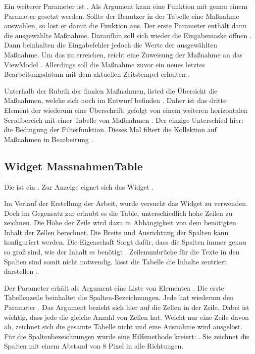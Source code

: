Ein weiterer Parameter ist  .
Als Argument kann eine Funktion mit genau einem Parameter gesetzt werden.
Sollte der Benutzer in der Tabelle eine Maßnahme auswählen, so löst er damit die Funktion aus.
Der erste Parameter enthält dann die ausgewählte Maßnahme.
Daraufhin soll sich wieder die Eingabemaske öffnen .
Dann beinhalten die Eingabefehler jedoch die Werte der ausgewählten Maßnahme.  Um das zu erreichen, reicht eine Zuweisung der Maßnahme an das ViewModel . Allerdings soll die Maßnahme zuvor ein neues letztes Bearbeitungsdatum mit dem aktuellen Zeitstempel erhalten .

Unterhalb der Rubrik der finalen Maßnahmen, listed die Übersicht die Maßnahmen, welche sich noch im Entwurf befinden .
Daher ist das dritte Element der  wiederum eine Überschrift:   gefolgt von einem weiteren horizontalen Scrollbereich  mit einer Tabelle von Maßnahmen .
Der einzige Unterschied hier: die Bedingung der Filterfunktion.
Dieses Mal filtert die Kollektion auf Maßnahmen in Bearbeitung .
\clearpage


\subsection{Widget MassnahmenTable}

Die  ist ein   .
Zur Anzeige eignet sich das Widget  . 



Im Verlauf der Erstellung der Arbeit, wurde versucht das Widget  zu verwenden.
Doch im Gegensatz zur  erlaubt es die Table, unterschiedlich hohe Zeilen zu zeichnen.
Die Höhe der Zeile wird dazu in Abhängigkeit von dem benötigten Inhalt der Zellen berechnet.
Die Breite und Ausrichtung der Spalten kann konfiguriert werden.
Die Eigenschaft  Sorgt dafür, dass die Spalten immer genau so groß sind, wie der Inhalt es benötigt .  Zeilenumbrüche für die Texte in den Spalten sind somit nicht notwendig. lässt die  Tabelle die Inhalte zentriert darstellen .

Der Parameter  erhält als Argument eine Liste von  Elementen .
Die erste Tabellenzeile  beinhaltet die Spalten-Bezeichnungen.
Jede  hat wiederum den Parameter .
Das Argument bezieht sich hier auf die Zellen in der Zeile.
Dabei ist wichtig, dass jede  die gleiche Anzahl von Zellen hat.
Weicht nur eine Zeile davon ab, zeichnet sich die gesamte Tabelle nicht und eine Ausnahme wird ausgelöst.
Für die Spaltenbezeichnungen wurde eine Hilfsmethode kreiert:  .
Sie zeichnet die Spalten mit einem Abstand von 8 Pixel in alle Richtungen.

